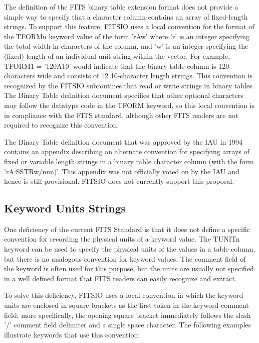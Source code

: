 \documentclass[11pt]{book}
\begin{document}
The definition of the FITS binary table extension format does not
provide a simple way to specify that a character column contains an
array of fixed-length strings.  To support this feature, FITSIO uses a
local convention for the format of the TFORMn keyword value of the form
'rAw' where 'r' is an integer specifying the total width in characters
of the column, and 'w' is an integer specifying the (fixed) length of
an individual unit string within the vector.  For example, TFORM1 =
'120A10' would indicate that the binary table column is 120 characters
wide and consists of 12 10-character length strings.  This convention
is recognized by the FITSIO subroutines that read or write strings in
binary tables.   The Binary Table definition document specifies that
other optional characters may follow the datatype code in the TFORM
keyword, so this local convention is in compliance with the
FITS standard, although other FITS readers are not required to
recognize this convention.

The Binary Table definition document that was approved by the IAU in
1994 contains an appendix describing an alternate convention for
specifying arrays of fixed or variable length strings in a binary table
character column (with the form 'rA:SSTRw/nnn)'.  This appendix was not
officially voted on by the IAU and hence is still provisional.  FITSIO
does not currently support this proposal.


\subsection{Keyword Units Strings}

One deficiency of the current FITS Standard is that it does not define
a specific convention for recording the physical units of a keyword
value.  The TUNITn keyword can be used to specify the physical units of
the values in a table column, but there is no analogous convention for
keyword values.  The comment field of the keyword is often used for
this purpose, but the units are usually not specified in a well defined
format that FITS readers can easily recognize and extract.

To solve this deficiency, FITSIO uses a local convention in which the
keyword units are enclosed in square brackets as the first token in the
keyword comment field; more specifically, the opening square bracket
immediately follows the slash '/' comment field delimiter and a single
space character.  The following examples illustrate keywords that use
this convention:
\end{document}
